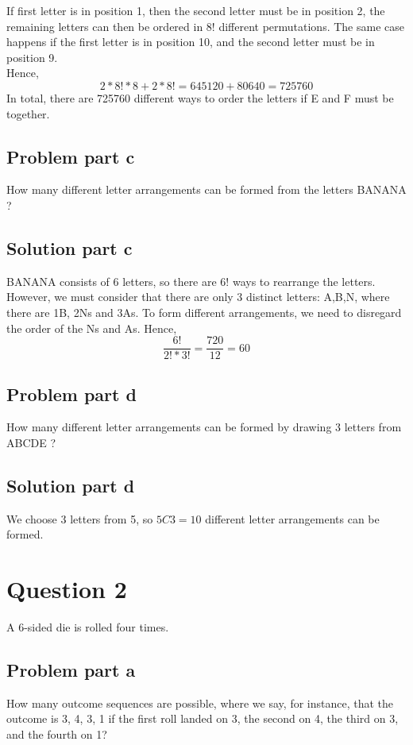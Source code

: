 \documentclass[12pt]{article}%
\begin{document}
If first letter is in position 1, then the second letter must be in position 2, the remaining letters can then be ordered in 8! different permutations. The same case happens if the first letter is in position 10, and the second letter must be in position 9. \\ 

Hence, 
\begin{equation}
2 * 8! * 8 + 2 * 8! = 645120 + 80640 = 725760 
\end{equation} 
In total, there are 725760 different ways to order the letters if E and F must be together. 
\subsection*{Problem part c}
How many different letter arrangements can be formed from the letters BANANA ?
\subsection*{Solution part c}
BANANA consists of 6 letters, so there are 6! ways to rearrange the letters. However, we must consider that there are only 3 distinct letters: A,B,N, where there are 1B, 2Ns and 3As. To form different arrangements, we need to disregard the order of the Ns and As. Hence,
\begin{equation}
\frac{6!}{2!*3!}=\frac{720}{12}=60
\end{equation}
\subsection*{Problem part d}
How many different letter arrangements can be formed by drawing 3 letters from ABCDE ?
\subsection*{Solution part d}
We choose 3 letters from 5, so \begin{math}5C3=10\end{math} different letter arrangements can be formed. 
\newpage
\section*{Question 2}
A 6-sided die is rolled four times.
\subsection*{Problem part a}
How many outcome sequences are possible, where we say, for instance, that the
outcome is 3, 4, 3, 1 if the first roll landed on 3, the second on 4, the third on 3, and the fourth on 1?
\end{document}
